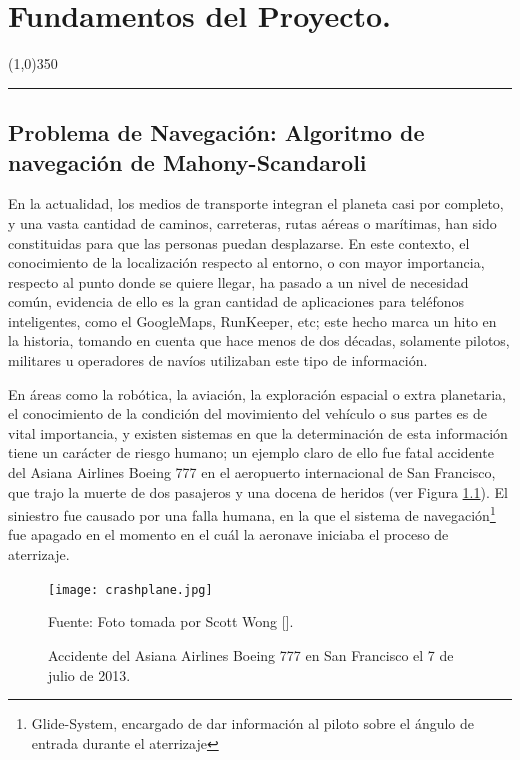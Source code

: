 \documentclass[10pt]{report}
\numberwithin{equation}{chapter}
\numberwithin{algorithm}{chapter}
\begin{document}
\chapter{Fundamentos del Proyecto.}
\begin{center}
\line(1,0){350}\\
\rule[-.4\baselineskip]{1.0\linewidth}{3.2pt}
\end{center}
\section{Problema de Navegación: Algoritmo de navegación de Mahony-Scandaroli}
En la actualidad, los medios de transporte integran el planeta casi por completo, y una vasta cantidad de caminos, carreteras, rutas aéreas o marítimas, han sido constituidas para que las personas puedan desplazarse. En este contexto, el conocimiento de la localización respecto al entorno, o con mayor importancia, respecto al punto donde se quiere llegar, ha pasado a un nivel de necesidad común, evidencia de ello es la gran cantidad de aplicaciones para teléfonos inteligentes, como el GoogleMaps, RunKeeper, etc; este hecho marca un hito en la historia, tomando en cuenta que hace menos de dos décadas, solamente pilotos, militares u operadores de navíos utilizaban este tipo de información. \par
En áreas como la robótica, la aviación, la exploración espacial o extra planetaria, el conocimiento de la condición del movimiento del vehículo o sus partes es de vital importancia, y existen sistemas en que la determinación de esta información tiene un carácter de riesgo humano; un ejemplo claro de ello fue fatal accidente del Asiana Airlines Boeing 777 en el aeropuerto internacional de San Francisco, que trajo la muerte de dos pasajeros y una docena de heridos (ver Figura \ref{descripcion_fig1}). El siniestro fue causado por una falla humana, en la que el sistema de navegación\footnote{Glide-System, encargado de dar información al piloto sobre el ángulo de entrada durante el aterrizaje} fue apagado en el momento en el cuál la aeronave iniciaba el proceso de aterrizaje.\par\begin{figure}\centering\texttt{[image: crashplane.jpg]}\caption{Accidente del Asiana Airlines Boeing 777 en San Francisco el 7 de julio de 2013.}\scriptsize{ Fuente: Foto tomada por Scott Wong [\cite{politico1}].}\label{descripcion_fig1}\end{figure}
\end{document}
